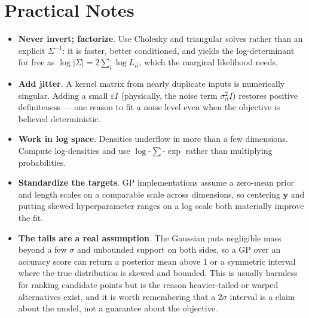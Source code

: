 \documentclass[conference]{IEEEtran}
\begin{document}
\section*{Practical Notes}
\begin{itemize}
    \item \textbf{Never invert; factorize}. Use Cholesky and triangular solves rather than an explicit $\Sigma^{-1}$: it is faster, better conditioned, and yields the log-determinant for free as $\log|\Sigma| = 2\sum_i \log L_{ii}$, which the marginal likelihood needs.
    \item \textbf{Add jitter}. A kernel matrix from nearly duplicate inputs is numerically singular. Adding a small $\varepsilon I$ (physically, the noise term $\sigma_n^2 I$) restores positive definiteness --- one reason to fit a noise level even when the objective is believed deterministic.
    \item \textbf{Work in log space}. Densities underflow in more than a few dimensions. Compute log-densities and use $\log$-$\sum$-$\exp$ rather than multiplying probabilities.
    \item \textbf{Standardize the targets}. GP implementations assume a zero-mean prior and length scales on a comparable scale across dimensions, so centering $\mathbf{y}$ and putting skewed hyperparameter ranges on a log scale both materially improve the fit.
    \item \textbf{The tails are a real assumption}. The Gaussian puts negligible mass beyond a few $\sigma$ and unbounded support on both sides, so a GP over an accuracy score can return a posterior mean above $1$ or a symmetric interval where the true distribution is skewed and bounded. This is usually harmless for ranking candidate points but is the reason heavier-tailed or warped alternatives exist, and it is worth remembering that a $2\sigma$ interval is a claim about the model, not a guarantee about the objective.
\end{itemize}
\end{document}
